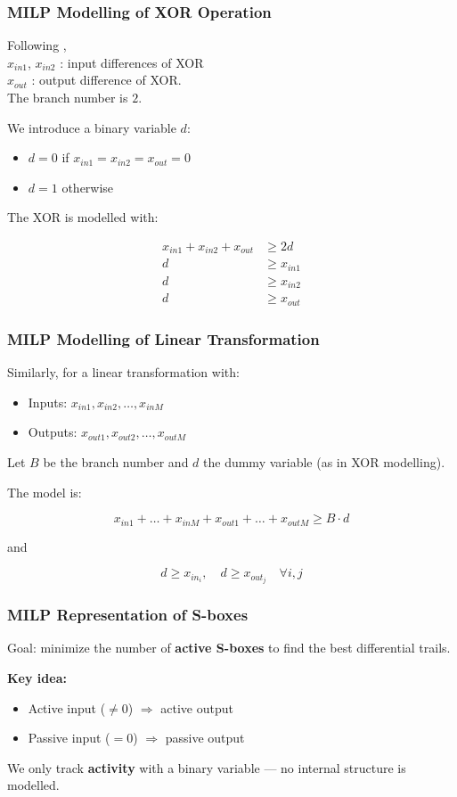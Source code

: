 \documentclass{beamer}
\begin{document}
\begin{frame}
\frametitle{MILP Modelling of XOR Operation}

Following \cite{mouha2012differential}, \\
$x_{in1}$, $x_{in2}$ : input differences of XOR \\
$x_{out}$ : output difference of XOR.\\  
The branch number is $2$.

We introduce a binary variable $d$:
\begin{itemize}
    \item $d = 0$ if $x_{in1} = x_{in2} = x_{out} = 0$
    \item $d = 1$ otherwise
\end{itemize}

The XOR is modelled with:


\[
\begin{aligned}
x_{in1} + x_{in2} + x_{out} &\geq 2d \\
d &\geq x_{in1} \\
d &\geq x_{in2} \\
d &\geq x_{out}
\end{aligned}
\]



\end{frame}

\begin{frame}
\frametitle{MILP Modelling of Linear Transformation}

Similarly, for a linear transformation with:
\begin{itemize}
    \item Inputs: $x_{in1}, x_{in2}, \dots, x_{inM}$
    \item Outputs: $x_{out1}, x_{out2}, \dots, x_{outM}$
\end{itemize}

Let $B$ be the branch number and $d$ the dummy variable (as in XOR modelling).

The model is:


\[
x_{in1} + \dots + x_{inM} + x_{out1} + \dots + x_{outM} \geq B \cdot d
\]


and  


\[
d \geq x_{in_{i}},\quad d \geq x_{out_{j}} \quad \forall i,j
\]



\end{frame}

\begin{frame}
\frametitle{MILP Representation of S-boxes}

Goal: minimize the number of \textbf{active S-boxes} to find the best differential trails.

\textbf{Key idea:}
\begin{itemize}
    \item Active input ($\neq 0$) $\Rightarrow$ active output
    \item Passive input ($= 0$) $\Rightarrow$ passive output
\end{itemize}

We only track \textbf{activity} with a binary variable — no internal structure is modelled.
\end{frame}
\end{document}
